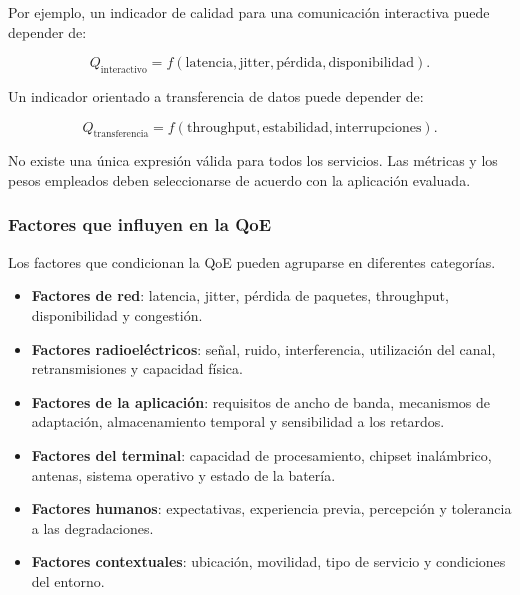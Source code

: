 Por ejemplo, un indicador de calidad para una comunicación interactiva
puede depender de:

\[
    Q_{\mathrm{interactivo}}
    =
    f
    \left(
        \text{latencia},
        \text{jitter},
        \text{pérdida},
        \text{disponibilidad}
    \right).
\]

Un indicador orientado a transferencia de datos puede depender de:

\[
    Q_{\mathrm{transferencia}}
    =
    f
    \left(
        \text{throughput},
        \text{estabilidad},
        \text{interrupciones}
    \right).
\]

No existe una única expresión válida para todos los servicios. Las
métricas y los pesos empleados deben seleccionarse de acuerdo con la
aplicación evaluada.


\subsubsection*{Factores que influyen en la QoE}

Los factores que condicionan la QoE pueden agruparse en diferentes
categorías.

\begin{itemize}
    \item \textbf{Factores de red}: latencia, jitter, pérdida de
    paquetes, throughput, disponibilidad y congestión.

    \item \textbf{Factores radioeléctricos}: señal, ruido,
    interferencia, utilización del canal, retransmisiones y capacidad
    física.

    \item \textbf{Factores de la aplicación}: requisitos de ancho de
    banda, mecanismos de adaptación, almacenamiento temporal y
    sensibilidad a los retardos.

    \item \textbf{Factores del terminal}: capacidad de procesamiento,
    chipset inalámbrico, antenas, sistema operativo y estado de la
    batería.

    \item \textbf{Factores humanos}: expectativas, experiencia previa,
    percepción y tolerancia a las degradaciones.

    \item \textbf{Factores contextuales}: ubicación, movilidad, tipo de
    servicio y condiciones del entorno.
\end{itemize}


